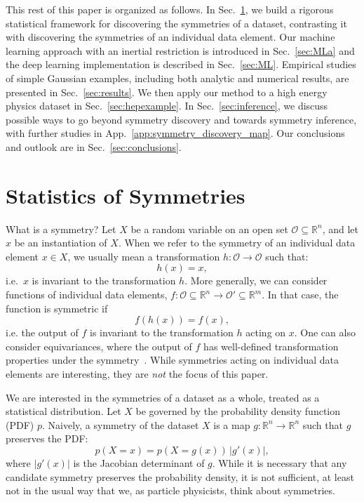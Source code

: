 \documentclass[aps,prx,reprint,preprintnumbers,superscriptaddress,nofootinbib,longbibliography,floatfix]{revtex4-1}
\newcommand{\R}{\mathbb{R}}
\renewcommand{\O}{\mathcal{O}}
\DeclareRobustCommand{\Sec}[1]{Sec.~\ref{sec:#1}}
\DeclareRobustCommand{\App}[1]{App.~\ref{app:#1}}
\begin{document}
 This rest of this paper is organized as follows.
 In \Sec{stats}, we build a rigorous statistical framework for discovering the symmetries of a dataset, contrasting it with discovering the symmetries of an individual data element.
 Our machine learning approach with an inertial restriction is introduced in \Sec{MLa} and the deep learning implementation is described in \Sec{ML}.
 Empirical studies of simple Gaussian examples, including both analytic and numerical results, are presented in \Sec{results}.
 We then apply our method to a high energy physics dataset in \Sec{hepexample}.
  In \Sec{inference}, we discuss possible ways to go beyond symmetry discovery and towards symmetry inference, with further studies in \App{symmetry_discovery_map}.
 Our conclusions and outlook are in \Sec{conclusions}.



\section{Statistics of Symmetries}
\label{sec:stats}

What is a symmetry?
%
Let $X$ be a random variable on an open set $\O\subseteq\R^n$, and let $x$ be an instantiation of $X$.
%
When we refer to the symmetry of an individual data element $x \in X$, we usually mean a transformation $h:\O\rightarrow\O$ such that:
%
\begin{equation}
    h(x) = x,
\end{equation}
%
i.e.\ $x$ is invariant to the transformation $h$.
%
More generally, we can consider functions of individual data elements, $f:\O\subseteq\mathbb{R}^n\rightarrow\O'\subseteq\mathbb{R}^m$.
%
In that case, the function is symmetric if
%
\begin{equation}
\label{eq:functionsymmetry}
    f(h(x)) = f(x),
\end{equation}
%
i.e. the output of $f$ is invariant to the transformation $h$ acting on $x$.
%
One can also consider equivariances, where the output of $f$ has well-defined transformation properties under the symmetry~\cite{Dolan:2020qkr,serviansky2020set2graph,Bogatskiy:2020tje,Shimmin:2021pkm}.
%
While symmetries acting on individual data elements are interesting, they are \emph{not} the focus of this paper.


We are interested in the symmetries of a dataset as a whole, treated as a statistical distribution.
%
Let $X$ be governed by the probability density function (PDF) $p$.
%
Naively, a symmetry of the dataset $X$ is a map $g:\mathbb{R}^n\rightarrow\mathbb{R}^n$ such that $g$ preserves the PDF:
%
\begin{equation}
\label{eq:naivesymmetry}
p(X = x) = p(X = g(x)) \, |g'(x)|,
\end{equation}
%
where $|g'(x)|$ is the Jacobian determinant of $g$.
%
While it is necessary that any candidate symmetry preserves the probability density, it is not sufficient, at least not in the usual way that we, as particle physicists, think about symmetries.
\end{document}
